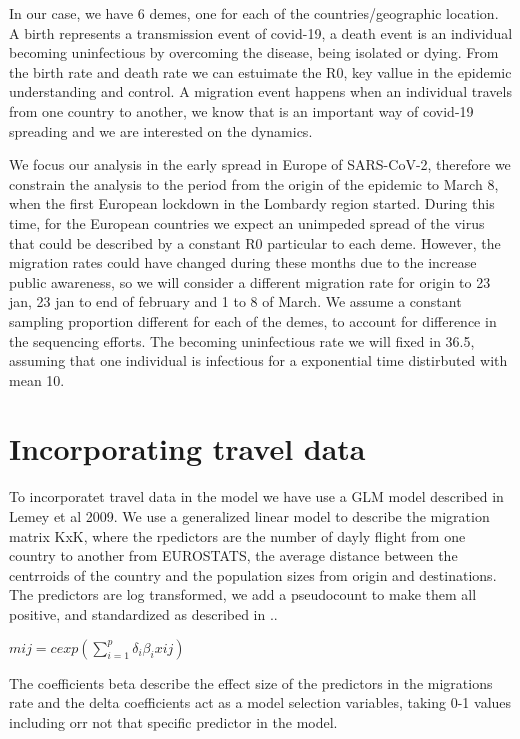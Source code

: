 In our case, we have 6 demes, one for each of the countries/geographic location. A birth represents a transmission event of covid-19, a death event is an individual becoming uninfectious by overcoming the disease, being isolated or dying. From the birth rate and death rate we can estuimate the R0, key vallue in the epidemic understanding and control. A migration event happens when an individual travels from one country to another, we know that is an important way of covid-19 spreading and we are interested on the dynamics. 

We focus our analysis in the early spread in Europe of SARS-CoV-2, therefore we constrain the analysis to the period from the origin of the epidemic to March 8, when the first European lockdown in the Lombardy region started. During this time, for the European countries we expect an unimpeded spread of the virus that could be described by a constant R0 particular to each deme. However, the migration rates could have changed during these months due to the increase public awareness, so we will consider a different migration rate for origin to 23 jan, 23 jan to end of february and 1 to 8 of March. We assume a constant sampling proportion different for each of the demes, to account for difference in the sequencing efforts. The becoming uninfectious rate we will fixed in 36.5, assuming that one individual is infectious for a exponential time distirbuted with mean 10.


\section{Incorporating travel data}

To incorporatet travel data in the model we have use a GLM model described in Lemey et al 2009. We use a generalized linear model to describe the migration matrix KxK, where the rpedictors are the number of dayly flight from one country to another from EUROSTATS, the average distance between the centrroids of the country and the population sizes from origin and destinations. The predictors are log transformed, we add a pseudocount to make them all positive, and standardized as described in ..

$mij = c exp(\sum_{i = 1}^p \delta_i \beta_i xij)$

The coefficients beta describe the effect size of the predictors in the migrations rate and the delta coefficients act as a model selection variables, taking 0-1 values including orr not that specific predictor in the model.


